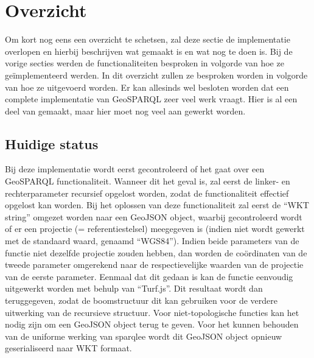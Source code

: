 \section{Overzicht}
\label{sec:impl_overzicht}
Om kort nog eens een overzicht te schetsen, zal deze sectie de implementatie overlopen en hierbij beschrijven wat gemaakt is en wat nog te doen is. Bij de vorige secties werden de functionaliteiten besproken in volgorde van hoe ze geïmplementeerd werden. In dit overzicht zullen ze besproken worden in volgorde van hoe ze uitgevoerd worden. Er kan allesinds wel besloten worden dat een complete implementatie van GeoSPARQL zeer veel werk vraagt. Hier is al een deel van gemaakt, maar hier moet nog veel aan gewerkt worden.

\subsection{Huidige status}
Bij deze implementatie wordt eerst gecontroleerd of het gaat over een GeoSPARQL functionaliteit. Wanneer dit het geval is, zal eerst de linker- en rechterparameter recursief opgelost worden, zodat de functionaliteit effectief opgelost kan worden. Bij het oplossen van deze functionaliteit zal eerst de ``WKT string'' omgezet worden naar een GeoJSON object, waarbij gecontroleerd wordt of er een projectie (= referentiestelsel) meegegeven is (indien niet wordt gewerkt met de standaard waard, genaamd ``WGS84''). Indien beide parameters van de functie niet dezelfde projectie zouden hebben, dan worden de coördinaten van de tweede parameter omgerekend naar de respectievelijke waarden van de projectie van de eerste parameter. Eenmaal dat dit gedaan is kan de functie eenvoudig uitgewerkt worden met behulp van ``Turf.js''. Dit resultaat wordt dan teruggegeven, zodat de boomstructuur dit kan gebruiken voor de verdere uitwerking van de recursieve structuur. Voor niet-topologische functies kan het nodig zijn om een GeoJSON object terug te geven. Voor het kunnen behouden van de uniforme werking van sparqlee wordt dit GeoJSON object opnieuw geserialiseerd naar WKT formaat. 


